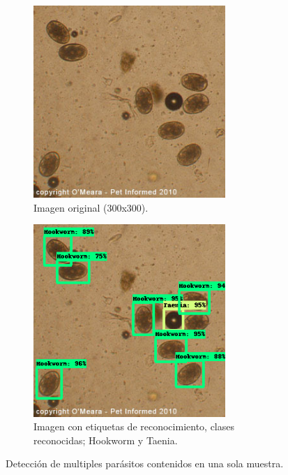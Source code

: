 \documentclass[letter,12pt]{report}
\begin{document}
\begin{figure}[H]
    \begin{subfigure}{0.5\textwidth}
        \centering
        \includegraphics[width=0.8\textwidth]{caca}
        \caption{Imagen original (300x300).}
        \label{fig:caca}
    \end{subfigure}
    \begin{subfigure}{0.5\textwidth}
        \centering
        \includegraphics[width=0.8\textwidth]{cacafit}
        \caption{Imagen con etiquetas de reconocimiento, clases reconocidas; Hookworm y
        Taenia.}
        \label{fig:cacafit}
    \end{subfigure}
    \caption{Detección de multiples parásitos contenidos en una sola muestra.}
    \label{fig:comparation_caca}
\end{figure}
\end{document}
